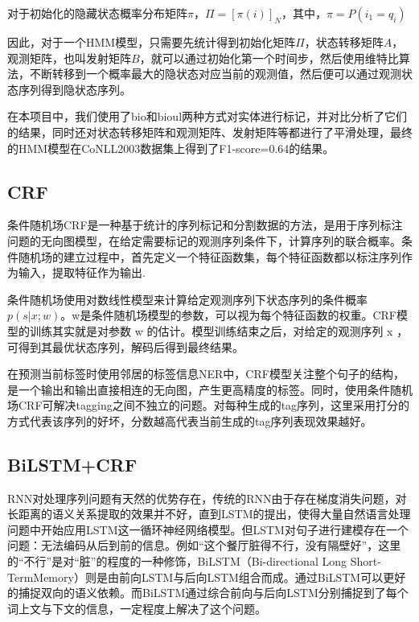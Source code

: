 \documentclass[a4paper, 12pt]{article}
\begin{document}
对于初始化的隐藏状态概率分布矩阵$\pi$，$\Pi = \left[ \pi(i) \right]_N$，其中，$\pi = P(i_1 = q_i)$

因此，对于一个HMM模型，只需要先统计得到初始化矩阵$\Pi$，状态转移矩阵$A$，观测矩阵，也叫发射矩阵$B$，就可以通过初始化第一个时间步，然后使用维特比算法，不断转移到一个概率最大的隐状态对应当前的观测值，然后便可以通过观测状态序列得到隐状态序列。

在本项目中，我们使用了bio和bioul两种方式对实体进行标记，并对比分析了它们的结果，同时还对状态转移矩阵和观测矩阵、发射矩阵等都进行了平滑处理，最终的HMM模型在CoNLL2003数据集上得到了F1-score=0.64的结果。


\subsection{CRF} %
\label{sub:crf}
条件随机场CRF是一种基于统计的序列标记和分割数据的方法，是用于序列标注问题的无向图模型，在给定需要标记的观测序列条件下，计算序列的联合概率。条件随机场的建立过程中，首先定义一个特征函数集，每个特征函数都以标注序列作为输入，提取特征作为输出.

条件随机场使用对数线性模型来计算给定观测序列下状态序列的条件概率$p(s|x;w)$。w是条件随机场模型的参数，可以视为每个特征函数的权重。CRF模型的训练其实就是对参数 w 的估计。模型训练结束之后，对给定的观测序列 x ，可得到其最优状态序列，解码后得到最终结果。

在预测当前标签时使用邻居的标签信息NER中，CRF模型关注整个句子的结构，是一个输出和输出直接相连的无向图，产生更高精度的标签。同时，使用条件随机场CRF可解决tagging之间不独立的问题。对每种生成的tag序列，这里采用打分的方式代表该序列的好坏，分数越高代表当前生成的tag序列表现效果越好。

\subsection{BiLSTM+CRF} %
\label{sub:bilstm}

RNN对处理序列问题有天然的优势存在，传统的RNN由于存在梯度消失问题，对长距离的语义关系提取的效果并不好，直到LSTM的提出，使得大量自然语言处理问题中开始应用LSTM这一循环神经网络模型。但LSTM对句子进行建模存在一个问题：无法编码从后到前的信息。例如“这个餐厅脏得不行，没有隔壁好”，这里的“不行”是对“脏”的程度的一种修饰，BiLSTM（Bi-directional Long Short-TermMemory）则是由前向LSTM与后向LSTM组合而成。通过BiLSTM可以更好的捕捉双向的语义依赖。而BiLSTM通过综合前向与后向LSTM分别捕捉到了每个词上文与下文的信息，一定程度上解决了这个问题。
\end{document}
